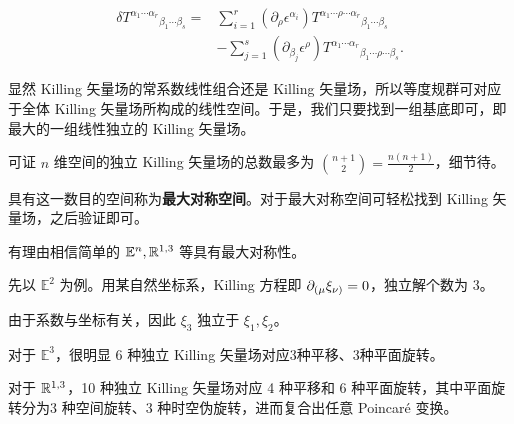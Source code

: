 \[
\begin{aligned}
\delta T^{\alpha_1\cdots\alpha_r}{}_{\beta_1\cdots\beta_s}
={}&
\sum_{i=1}^r
(\partial_\rho\epsilon^{\alpha_i})
T^{\alpha_1\cdots\rho\cdots\alpha_r}{}_{\beta_1\cdots\beta_s}\\
&-
\sum_{j=1}^s
(\partial_{\beta_j}\epsilon^\rho)
T^{\alpha_1\cdots\alpha_r}{}_{\beta_1\cdots\rho\cdots\beta_s}.
\end{aligned}
\]

显然 Killing 矢量场的常系数线性组合还是 Killing 矢量场，所以等度规群可对应于全体 Killing 矢量场所构成的线性空间。于是，我们只要找到一组基底即可，即最大的一组线性独立的 Killing 矢量场。

可证 $n$ 维空间的独立 Killing 矢量场的总数最多为 $\binom{n+1}{2}=\frac{n(n+1)}2$，细节待。

具有这一数目的空间称为\textbf{最大对称空间}。对于最大对称空间可轻松找到 Killing 矢量场，之后验证即可。

有理由相信简单的 $\mathbb{E}^n, \mathbb{R}^{1,3}$ 等具有最大对称性。

先以 $\mathbb{E}^2$ 为例。用某自然坐标系，Killing 方程即 $\partial_{(\mu}\xi_{\nu)}=0$，独立解个数为 3。

由于系数与坐标有关，因此 $\xi_3$ 独立于 $\xi_1,\xi_2$。

对于 $\mathbb E^3$，很明显 6 种独立 Killing 矢量场对应3种平移、3种平面旋转。

对于 $\mathbb{R}^{1,3}$，10 种独立 Killing 矢量场对应 4 种平移和 6 种平面旋转，其中平面旋转分为3 种空间旋转、3 种时空伪旋转，进而复合出任意 Poincaré 变换。

